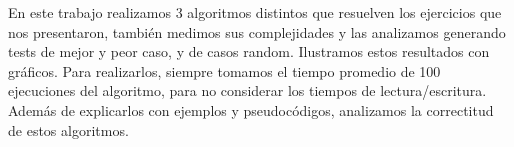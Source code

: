 En este trabajo realizamos 3 algoritmos distintos que resuelven los ejercicios que nos presentaron, también medimos sus complejidades y las analizamos generando tests de mejor y peor caso, y de casos random. Ilustramos estos resultados con gráficos. Para realizarlos, siempre tomamos el tiempo promedio de 100 ejecuciones del algoritmo, para no considerar los tiempos de lectura/escritura. Además de explicarlos con ejemplos y pseudocódigos, analizamos la correctitud de estos algoritmos.
